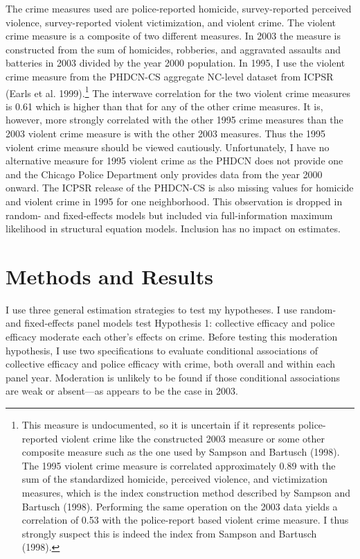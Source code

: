 \documentclass [11pt, proquest] {uwthesis}[2015/03/03]
\begin{document}
The crime measures used are police-reported homicide, survey-reported perceived violence, survey-reported violent victimization, and violent crime. The violent crime measure is a composite of two different measures. In 2003 the measure is constructed from the sum of homicides, robberies, and aggravated assaults and batteries in 2003 divided by the year 2000 population. In 1995, I use the violent crime measure from the PHDCN-CS aggregate NC-level dataset from ICPSR (Earls et al. 1999).\footnote{This measure is undocumented, so it is uncertain if it represents police-reported violent crime like the constructed 2003 measure or some other composite measure such as the one used by Sampson and Bartusch (1998). The 1995 violent crime measure is correlated approximately 0.89 with the sum of the standardized homicide, perceived violence, and victimization measures, which is the index construction method described by Sampson and Bartusch (1998). Performing the same operation on the 2003 data yields a correlation of 0.53 with the police-report based violent crime measure. I thus strongly suspect this is indeed the index from Sampson and Bartusch (1998).} The interwave correlation for the two violent crime measures is 0.61 which is higher than that for any of the other crime measures. It is, however, more strongly correlated with the other 1995 crime measures than the 2003 violent crime measure is with the other 2003 measures. Thus the 1995 violent crime measure should be viewed cautiously. Unfortunately, I have no alternative measure for 1995 violent crime as the PHDCN does not provide one and the Chicago Police Department only provides data from the year 2000 onward. The ICPSR release of the PHDCN-CS is also missing values for homicide and violent crime in 1995 for one neighborhood. This observation is dropped in random- and fixed-effects models but included via full-information maximum likelihood in structural equation models. Inclusion has no impact on estimates.

\hypertarget{methods-and-results}{%
\section{Methods and Results}\label{methods-and-results}}

I use three general estimation strategies to test my hypotheses. I use random- and fixed-effects panel models test Hypothesis 1: collective efficacy and police efficacy moderate each other's effects on crime. Before testing this moderation hypothesis, I use two specifications to evaluate conditional associations of collective efficacy and police efficacy with crime, both overall and within each panel year. Moderation is unlikely to be found if those conditional associations are weak or absent---as appears to be the case in 2003.
\end{document}
